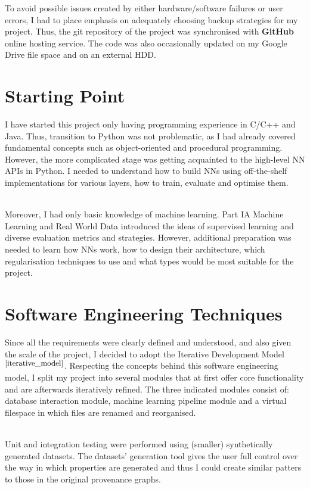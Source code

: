 To avoid possible issues created by either hardware/software failures or user errors, I had to place emphasis on adequately choosing backup strategies for my project. Thus, the git repository of the project was synchronised with \textbf{GitHub} online hosting service. The code was also occasionally updated on my Google Drive file space and on an external HDD. \\

\section{Starting Point}

I have started this project only having programming experience in C/C++ and Java. Thus, transition to Python was not problematic, as I had already covered fundamental concepts such as object-oriented and procedural programming. However, the more complicated stage was getting acquainted to the high-level NN APIs in Python. I needed to understand how to build NNs using off-the-shelf implementations for various layers, how to train, evaluate and optimise them. \\\

Moreover, I had only basic knowledge of machine learning. Part IA Machine Learning and Real World Data introduced the ideas of supervised learning and diverse evaluation metrics and strategies. However, additional preparation was needed to learn how NNs work, how to design their architecture, which regularisation techniques to use and what types would be most suitable for the project. \\

\section{Software Engineering Techniques}

Since all the requirements were clearly defined and understood, and also given the scale of the project, I decided to adopt the Iterative Development Model$^{\small \cite{iterative_model}}$. Respecting the concepts behind this software engineering model, I split my project into several modules that at first offer core functionality and are afterwards iteratively refined. The three indicated modules
consist of: database interaction module, machine learning pipeline module and a virtual filespace in which files are renamed and reorganised. \\\

Unit and integration testing were performed using (smaller) synthetically generated datasets. The datasets' generation tool gives the user full control over the way in which properties are generated and thus I could create similar patters to those in the original provenance graphs. \\

